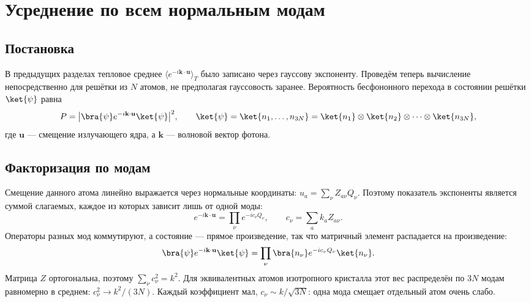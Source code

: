 \documentclass[../final.tex]{subfiles}
\begin{document}
\ifSubfilesClassLoaded{\setcounter{chapter}{7}\setcounter{section}{8}}{}

\section{Усреднение по всем нормальным модам}
\subsection{Постановка}
В предыдущих разделах тепловое среднее $\langle e^{-i\mathbf k\cdot\mathbf u}\rangle_T$
было записано через гауссову экспоненту. Проведём теперь вычисление
непосредственно для решётки из $N$ атомов, не предполагая гауссовость заранее.
Вероятность бесфононного перехода в состоянии решётки $\ket{\psi}$ равна
\begin{equation*}
 P=\bigl|\bra{\psi}e^{-i\mathbf k\cdot\mathbf u}\ket{\psi}\bigr|^2,\qquad
 \ket{\psi}=\ket{n_1,\ldots,n_{3N}}
 =\ket{n_1}\otimes\ket{n_2}\otimes\cdots\otimes\ket{n_{3N}},
\end{equation*}
где $\mathbf u$ --- смещение излучающего ядра, а $\mathbf k$ --- волновой вектор
фотона.

\subsection{Факторизация по модам}
Смещение данного атома линейно выражается через нормальные координаты:
$u_a=\sum_\nu Z_{a\nu}Q_\nu$. Поэтому показатель экспоненты является суммой
слагаемых, каждое из которых зависит лишь от одной моды:
\begin{equation*}
 e^{-i\mathbf k\cdot\mathbf u}=\prod_\nu e^{-ic_\nu Q_\nu},\qquad
 c_\nu=\sum_a k_aZ_{a\nu}.
\end{equation*}
Операторы разных мод коммутируют, а состояние --- прямое произведение,
так что матричный элемент распадается на произведение:
\begin{equation*}
 \bra{\psi}e^{-i\mathbf k\cdot\mathbf u}\ket{\psi}
 =\prod_\nu\bra{n_\nu}e^{-ic_\nu Q_\nu}\ket{n_\nu}.
\end{equation*}
Матрица $Z$ ортогональна, поэтому $\sum_\nu c_\nu^2=k^2$.
Для эквивалентных атомов изотропного кристалла этот вес распределён
по $3N$ модам равномерно в среднем: $c_\nu^2\to k^2/(3N)$.
Каждый коэффициент мал, $c_\nu\sim k/\sqrt{3N}$: одна мода смещает
отдельный атом очень слабо.
\end{document}
